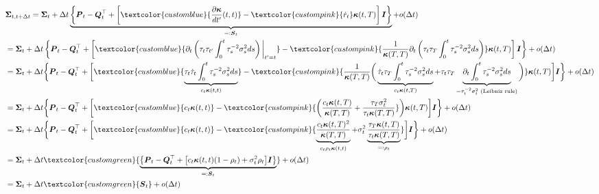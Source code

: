 \documentclass{article}
\newcommand{\bluetext}[1]{\textcolor{customblue}{#1}}
\newcommand{\greentext}[1]{\textcolor{customgreen}{#1}}
\newcommand{\pinktext}[1]{\textcolor{custompink}{#1}}
\begin{document}
\begin{small}
\begin{align}
    &\boldsymbol{\Sigma}_{t, t+\Delta t}=\boldsymbol{\Sigma}_t+\Delta t\underbrace{\left\{\boldsymbol{P}_t-\boldsymbol{Q}_t^\top+\left[\bluetext{\frac{\partial\boldsymbol{\kappa}}{dt'}(t,t)}-\pinktext{\dot{r}_t}\boldsymbol{\kappa}(t,T)\right]\boldsymbol{I}\right\}}_{=:\boldsymbol{S}_t}+o(\Delta t)\label{eq:gaus-S-def2}\\
    &=\boldsymbol{\Sigma}_t+\Delta t\left\{\boldsymbol{P}_t-\boldsymbol{Q}_t^\top+\left[\bluetext{\partial_t\left(\tau_t\tau_{t'}\int_0^t\tau_s^{-2}\sigma_s^2ds\right)\bigg\vert_{t'=t}}-\pinktext{\frac{1}{\boldsymbol{\kappa}(T,T)}\partial_t\left(\tau_t\tau_T\int_0^t\tau_s^{-2}\sigma_s^2ds\right)}\boldsymbol{\kappa}(t,T)\right]\boldsymbol{I}\right\}+o(\Delta t)\nonumber\\
    &=\boldsymbol{\Sigma}_t+\Delta t\bigg\{\boldsymbol{P}_t-\boldsymbol{Q}_t^\top+\bigg[\bluetext{\underbrace{\tau_t\dot{\tau}_t\int_0^t\tau_s^{-2}\sigma_s^2ds}_{c_t\boldsymbol{\kappa}(t,t)}}-\pinktext{\frac{1}{\boldsymbol{\kappa}(T,T)}\bigg(\underbrace{\dot{\tau}_t\tau_T\int_0^t\tau_s^{-2}\sigma_s^2ds}_{c_t\boldsymbol{\kappa}(t,T)}+\tau_t\tau_T\underbrace{\partial_t\int_0^t\tau_s^{-2}\sigma_s^2ds}_{=\tau_t^{-2}\sigma_t^2\text{ (Leibniz rule)}}\bigg)}\boldsymbol{\kappa}(t,T)\bigg]\boldsymbol{I}\bigg\}+o(\Delta t)\nonumber\\
    &=\boldsymbol{\Sigma}_t+\Delta t\bigg\{\boldsymbol{P}_t-\boldsymbol{Q}_t^\top+\bigg[\bluetext{c_t\boldsymbol{\kappa}(t,t)}-\pinktext{\bigg(\frac{c_t\boldsymbol{\kappa}(t,T)}{\boldsymbol{\kappa}(T,T)}+\frac{\tau_T\sigma_t^2}{\tau_t\boldsymbol{\kappa}(T,T)}}\bigg)\boldsymbol{\kappa}(t,T)\bigg]\boldsymbol{I}\bigg\}+o(\Delta t)\nonumber\\
    &=\boldsymbol{\Sigma}_t+\Delta t\bigg\{\boldsymbol{P}_t-\boldsymbol{Q}_t^\top+\bigg[\bluetext{c_t\boldsymbol{\kappa}(t,t)}-\pinktext{\underbrace{\frac{c_t\boldsymbol{\kappa}(t,T)^2}{\boldsymbol{\kappa}(T,T)}}_{c_t\rho_t\boldsymbol{\kappa}(t,t)}+\sigma_t^2\underbrace{\frac{\tau_T\boldsymbol{\kappa}(t,T)}{\tau_t\boldsymbol{\kappa}(T,T)}}_{=:\rho_t}}\bigg]\boldsymbol{I}\bigg\}+o(\Delta t)\nonumber\\
    &=\boldsymbol{\Sigma}_t+\Delta t\greentext{\underbrace{\big\{\boldsymbol{P}_t-\boldsymbol{Q}_t^\top+\big[c_t\boldsymbol{\kappa}(t,t)(1-\rho_t)+\sigma_t^2\rho_t\big]\boldsymbol{I}\big\}}_{=:\boldsymbol{S}_t}}+o(\Delta t)\nonumber\\
    &=\boldsymbol{\Sigma}_t+\Delta t\greentext{\boldsymbol{S}_t}+o(\Delta t)\label{eq:gaussian-cross-cov}
\end{align}
\end{small}
\end{document}
